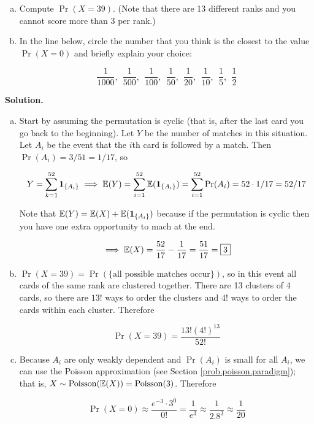 \begin{enumerate}[(1)]
\begin{enumerate}[(a)]
\item Compute \(\Pr(X = 39)\). (Note that there are 13 different ranks and you cannot score more than 3 per rank.)

\item In the line below, circle the number that you think is the closest to the value \(\Pr(X=0)\) and briefly explain your choice:

\[
\frac{1}{1000}, \ \ \frac{1}{500}, \ \ \frac{1}{100}, \ \ \frac{1}{50}, \ \ \frac{1}{20}, \ \ \frac{1}{10}, \ \ \frac{1}{5}, \ \ \frac{1}{2}
\]

\end{enumerate}


\textbf{Solution.}

\begin{enumerate}[(a)]

\item Start by assuming the permutation is cyclic (that is, after the last card you go back to the beginning). Let \(Y\) be the number of matches in this situation. Let \(A_i\) be the event that the \(i\)th card is followed by a match. Then \(\Pr(A_i) = 3/51 = 1/17\), so

\[
Y = \sum_{k=1}^{52} \boldsymbol{1}_{\{A_i\}} \implies \mathbb{E}(Y) = \sum_{i=1}^{52} \mathbb{E}(\boldsymbol{1}_{\{A_i\}}) = \sum_{i=1}^{52} \Pr(A_i) = 52 \cdot 1/17 = 52/17
\]

Note that \(\mathbb{E}(Y) = \mathbb{E}(X) + \mathbb{E}(\boldsymbol{1}_{\{A_i\}})\) because if the permutation is cyclic then you have one extra opportunity to mach at the end.

\[
\implies \mathbb{E}(X) = \frac{52}{17} - \frac{1}{17} = \frac{51}{17} = \boxed{3}
\]

\item \(\Pr(X=39) = \Pr(\{\text{all possible matches occur}\})\), so in this event all cards of the same rank are clustered together. There are 13 clusters of 4 cards, so there are \(13!\) ways to order the clusters and \(4!\) ways to order the cards within each cluster. Therefore

\[
\boxed{
\Pr(X=39) = \frac{13! (4!)^{13}}{52!} }
\]

\item Because \(A_i\) are only weakly dependent and \(\Pr(A_i)\) is small for all \(A_i\), we can use the Poisson approximation (see Section \ref{prob.poisson.paradigm}); that is, \(X \sim \operatorname{Poisson}(\mathbb{E}(X)) = \operatorname{Poisson}(3)\). Therefore

\[
\Pr(X=0) \approx \frac{e^{-3}\cdot3^0}{0!} = \frac{1}{e^3} \approx \frac{1}{2.8^3} \approx \boxed{\frac{1}{20}}
\]


\end{enumerate}


\end{enumerate}

